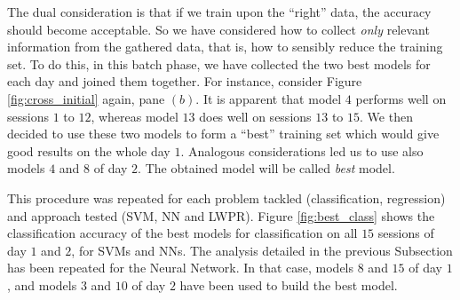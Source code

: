 

The dual consideration is that if we train upon the ``right'' data,
the accuracy should become acceptable. So we have considered how to
collect \emph{only} relevant information from the gathered data, that
is, how to sensibly reduce the training set. To do this, in this batch
phase, we have collected the two best models for each day and joined
them together. For instance, consider Figure \ref{fig:cross_initial}
again, pane $(b)$. It is apparent that model $4$ performs well on
sessions $1$ to $12$, whereas model $13$ does well on sessions $13$ to
$15$. We then decided to use these two models to form a ``best''
training set which would give good results on the whole day
$1$. Analogous considerations led us to use also models $4$ and $8$ of
day $2$. The obtained model will be called \emph{best} model.

This procedure was repeated for each problem tackled (classification,
regression) and approach tested (SVM, NN and LWPR). Figure
\ref{fig:best_class} shows the classification accuracy of the best
models for classification on all $15$ sessions of day $1$ and $2$, for
SVMs and NNs. The analysis detailed in the previous Subsection has
been repeated for the Neural Network. In that case, models $8$ and
$15$ of day $1$, and models $3$ and $10$ of day $2$ have been used to
build the best model.

